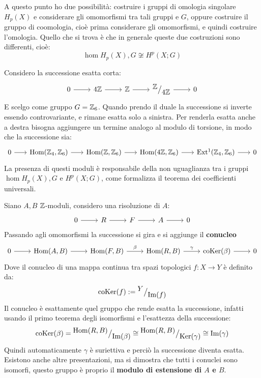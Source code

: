 A questo punto ho due possibilità: costruire i gruppi di omologia singolare
$ H_p(X) $ e considerare gli omomorfismi tra tali gruppi e $ G $, oppure
costruire il gruppo di coomologia, cioè prima considerare gli omomorfismi, e
quindi costruire l'omologia. Quello che si trova è che in generale queste
due costruzioni sono differenti, cioè:
\[
  \hom{H_p(X), G} \not \cong H^p(X ; G)
\]

\begin{example}
  Considero la successione esatta corta:
  \[
    \begin{tikzcd}
      0 \rar & 4 \Z \rar & \Z \rar & \quot{\Z}{4\Z} \rar & 0
    \end{tikzcd}
  \]
  E scelgo come gruppo $ G = \mathbb{Z}_6 $.
  Quando prendo il duale la successione si inverte essendo controvariante,
  e rimane esatta solo a sinistra. Per renderla esatta anche a destra bisogna
  aggiungere un termine analogo al modulo di torsione, in modo che la successione
  sia:
  \[
    \begin{tikzcd}[nodes = {column sep = 18 pt}]
      0 \rar & \hom{\Z_4, \Z_6} \rar & \hom{\Z, \Z_6} \rar & \hom{4\Z, \Z_6} \rar & \ext{\Z_4, \Z_6} \rar & 0
    \end{tikzcd}
  \]
  La presenza di questi moduli è responsabile della non uguaglianza tra i gruppi
  $ \hom{H_p(X), G} $ e $ H^p(X ; G) $, come formalizza il teorema dei
  coefficienti universali.
\end{example}
\begin{definition}
  Siano $ A, B $ $ \mathbb{Z} $-moduli, considero una risoluzione di $ A $:
  \[
    \begin{tikzcd}
      0 \rar & R \rar & F \rar & A \rar & 0
    \end{tikzcd}
  \]
  Passando agli omomorfismi la successione si gira e si aggiunge il \textbf{conucleo}
  \[
    \begin{tikzcd}
      0 \rar & \hom{A,B} \rar & \hom{F,B} \rar{\beta} & \hom{R,B} \rar{\gamma} & \coker{\beta} \rar & 0
    \end{tikzcd}
  \]
  Dove il conucleo di una mappa continua tra spazi topologici $ f \colon X \to Y $ è definito
  da:
  \[
    \mathrm{coKer}( f) := {^{\textstyle Y}\big/_{\textstyle \mathrm{Im}( f )}}
  \]
  Il conucleo è esattamente quel gruppo che rende esatta la successione, infatti
  usando il primo teorema degli isomorfismi e l'esattezza della successione:
  \[
    \mathrm{coKer}( \beta) = {^{\textstyle \mathrm{Hom}( R,B)}\big/_{\textstyle \mathrm{Im}( \beta )}} \cong {^{\textstyle \mathrm{Hom}( R,B)}\big/_{\textstyle \mathrm{Ker}( \gamma)}} \cong \mathrm{Im}( \gamma )
  \]
  Quindi automaticamente $ \gamma $ è suriettiva e perciò la successione diventa esatta.
  Esistono anche altre presentazioni, ma si dimostra che tutti i conuclei sono isomorfi,
  questo gruppo è proprio il \textbf{modulo di estensione di $ A $ e $ B $}.
\end{definition}
